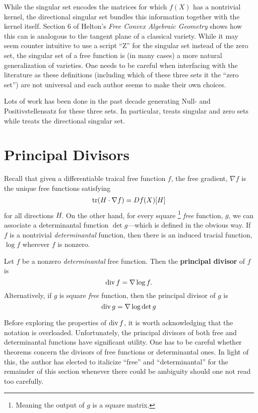 While the singular set encodes the matrices for which \(f(X)\) has a nontrivial
kernel, the directional singular set bundles this information together with the
kernel itself. Section 6 of Helton's \emph{Free Convex Algebraic Geometry}
\cite{heltonFree2013} shows how this can is analogous to the tangent plane of a
classical variety. While it may seem counter intuitive to use a script ``Z''
for the singular set instead of the zero set, the singular set of a free
function is (in many cases) a more natural generalization of varieties.
One needs to be careful when interfacing with the literature as these
definitions (including which of these three sets it the ``zero set'') are not
universal and each author seems to make their own choices.

{\color{fgreen} Lots of work has been done in the past decade} generating Null- and
Positivstellensatz for these three sets. In particular,
\cite{heltonFactorization2019} treats singular and zero sets while
\cite{heltonStrong2007} treats the directional singular set.

\section{Principal Divisors}%
\label{sec:prindiv}

Recall that given a differentiable traical free function \(f\), the free
gradient, \(\nabla f\) is the unique free functions satisfying
\[
  \operatorname{tr} (H \cdot \nabla f) = Df(X)[H]
\]
for all directions \(H\). On the other hand, for every square
\footnote{Meaning the output of \(g\) is a square matrix.}
\emph{free} function, \(g\), we can associate a determinantal function
\(\det g\)---which is defined in the obvious way. If \(f\) is a nontrivial
\emph{determinantal} function, then there is an induced tracial function,
\(\log f\) wherever \(f\) is nonzero.


\begin{definition}%
\label{def:princdiv}
Let \(f\) be a nonzero \emph{determinantal} free function. Then the
\textbf{principal divisor} of \(f\) is
\[
  \operatorname{div} f = \nabla \log f.
\]
Alternatively, if \(g\) is square \emph{free} function, then the principal divisor of
\(g\) is
\[
  \operatorname{div} g = \nabla \log \det g
\]
\end{definition}

Before exploring the properties of \(\operatorname{div} f\), it is worth acknowledging that
the notation is overloaded. Unfortunately, the principal divisors of both free
and determinantal functions have significant utility. One has to be careful
whether theorems concern the divisors of free functions or determinantal ones.
In light of this, the author has elected to italicize ``free'' and
``determinantal'' for the remainder of this section whenever there could be
ambiguity should one not read too carefully.

